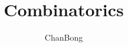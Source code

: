 \documentclass[a4paper]{report}
\author{ChanBong}
\title{Combinatorics}
\begin{document}
    \maketitle
    \tableofcontents
    \pagebreak
    
\end{document}
